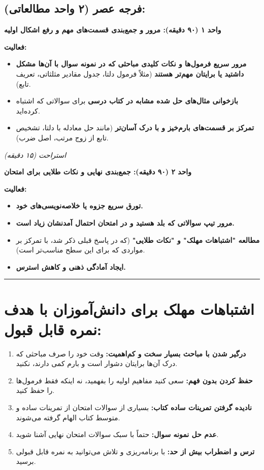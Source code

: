 \documentclass[12pt,a4paper]{article}
\newcommand{\studyunit}[1]{\par\medskip\noindent\textbf{#1}\par\nopagebreak}
\newcommand{\activities}{\par\medskip\noindent\textbf{فعالیت:}\begin{itemize}[nosep,after=\vspace{-0.5\baselineskip}]}
\newcommand{\breaktime}[1]{\par\smallskip\centerline{\textit{#1}}\smallskip}
\begin{document}
\subsection*{فرجه عصر (۲ واحد مطالعاتی):}
    \studyunit{واحد ۱ (۹۰ دقیقه): مرور و جمع‌بندی قسمت‌های مهم و رفع اشکال اولیه}
        \activities
            \item \textbf{مرور سریع فرمول‌ها و نکات کلیدی مباحثی که در نمونه سوال با آن‌ها مشکل داشتید یا برایتان مهم‌تر هستند} (مثلاً فرمول دلتا، جدول مقادیر مثلثاتی، تعریف تابع).
            \item \textbf{بازخوانی مثال‌های حل شده مشابه در کتاب درسی} برای سوالاتی که اشتباه کرده‌اید.
            \item \textbf{تمرکز بر قسمت‌های بارم‌خیز و با درک آسان‌تر} (مانند حل معادله با دلتا، تشخیص تابع از زوج مرتب، اصل ضرب).
        \end{itemize}

    \breaktime{استراحت (۱۵ دقیقه)}

    \studyunit{واحد ۲ (۹۰ دقیقه): جمع‌بندی نهایی و نکات طلایی برای امتحان}
        \activities
            \item \textbf{تورق سریع جزوه یا خلاصه‌نویسی‌های خود.}
            \item \textbf{مرور تیپ سوالاتی که بلد هستید و در امتحان احتمال آمدنشان زیاد است.}
            \item \textbf{مطالعه "اشتباهات مهلک" و "نکات طلایی"} (که در پاسخ قبلی ذکر شد، با تمرکز بر مواردی که برای این سطح مناسب‌تر است).
            \item \textbf{ایجاد آمادگی ذهنی و کاهش استرس.}
        \end{itemize}

\rule{\linewidth}{0.4pt}\vspace{1em}

\section*{اشتباهات مهلک برای دانش‌آموزان با هدف نمره قابل قبول:}
\begin{enumerate}[label=\arabic*., itemsep=0.2em, topsep=0.3em]
    \item \textbf{درگیر شدن با مباحث بسیار سخت و کم‌اهمیت:} وقت خود را صرف مباحثی که درک آن‌ها برایتان دشوار است و بارم کمی دارند، نکنید.
    \item \textbf{حفظ کردن بدون فهم:} سعی کنید مفاهیم اولیه را بفهمید، نه اینکه فقط فرمول‌ها را حفظ کنید.
    \item \textbf{نادیده گرفتن تمرینات ساده کتاب:} بسیاری از سوالات امتحان از تمرینات ساده و متوسط کتاب الهام گرفته می‌شوند.
    \item \textbf{عدم حل نمونه سوال:} حتماً با سبک سوالات امتحان نهایی آشنا شوید.
    \item \textbf{ترس و اضطراب بیش از حد:} با برنامه‌ریزی و تلاش می‌توانید به نمره قابل قبولی برسید.
\end{enumerate}
\end{document}
